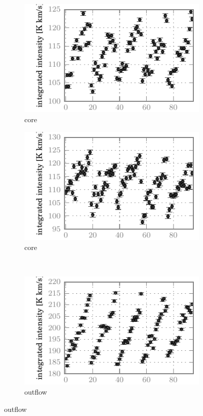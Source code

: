 \begin{figure}[hbtp]
    \centering
    \begin{subfigure}[b]{0.5\textwidth}
        \includegraphics{co87_core_iint}
        \caption{ core}
    \end{subfigure}%
    \begin{subfigure}[b]{0.5\textwidth}
        \includegraphics{co98_core_iint}
        \caption{ core}
    \end{subfigure}%
    \\
    \begin{subfigure}[b]{0.5\textwidth}
        \includegraphics{co87_outf_iint}
        \caption{ outflow}
    \end{subfigure}%

\end{figure}
